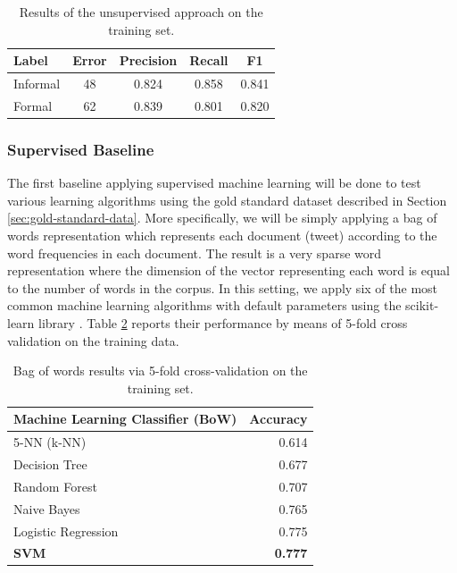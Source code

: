 \documentclass[information,article,submit,moreauthors,pdftex,10pt,a4paper]{Definitions/mdpi}
\begin{document}
\begin{table}[H]
  \centering
  \begin{tabular}{lcccc} \hline
    Label & Error & Precision & Recall & F1 \\ \hline \hline
    Informal & 48 & 0.824  & 0.858  & 0.841 \\
    Formal & 62 & 0.839 & 0.801 & 0.820 \\ \hline
  \end{tabular}
  \caption{Results of the unsupervised approach on the training set.}
  \label{tab:perplexitytrain}
\end{table}

\subsubsection{Supervised Baseline}\label{sec:sparse-word-repr}

The first baseline applying supervised machine learning will be done to test various learning algorithms using the gold standard dataset described in Section \ref{sec:gold-standard-data}. More specifically, we will be simply applying a bag of words representation which represents each document (tweet) according to the word frequencies in each document. The result is a very sparse word representation where the dimension of the vector representing each word is equal to the number of words in the corpus. In this setting, we apply six of the most common machine learning algorithms with default parameters using the scikit-learn library \cite{pedregosa2011scikit}. Table \ref{tab:acc-ml} reports their performance by means of 5-fold cross validation on the training data.

\begin{table}[H]
  \centering
  \begin{tabular}{lr} \hline
    Machine Learning Classifier (BoW) & Accuracy \\ \hline \hline
    5-NN (k-NN) &  0.614 \\
    Decision Tree &  0.677 \\
    Random Forest &  0.707 \\
    Naive Bayes & 0.765 \\
    Logistic Regression & 0.775 \\
    \textbf{SVM} & \textbf{0.777} \\ \hline
  \end{tabular}
  \caption{Bag of words results via 5-fold cross-validation on the training set.}
  \label{tab:acc-ml}
\end{table}
\end{document}
